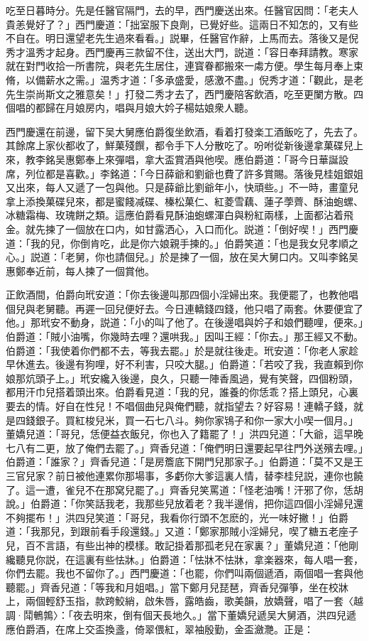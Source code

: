吃至日暮時分。先是任醫官隔門，去的早，西門慶送出來。任醫官因問：「老夫人貴恙覺好了？」西門慶道：「拙室服下良劑，已覺好些。這兩日不知怎的，又有些不自在。明日還望老先生過來看看。」説畢，任醫官作辭，上馬而去。落後又是倪秀才溫秀才起身。西門慶再三款留不住，送出大門，説道：「容日奉拜請教。寒家就在對門收拾一所書院，與老先生居住，連寳眷都搬來一䖏方便。學生每月奉上束脩，以備薪水之需。」温秀才道：「多承盛愛，感激不盡。」倪秀才道：「觀此，是老先生崇尚斯文之雅意矣！」打發二秀才去了，西門慶陪客飲酒，吃至更闌方散。四個唱的都歸在月娘房内，唱與月娘大妗子楊姑娘衆人聽。

西門慶還在前邊，留下吴大舅應伯爵復坐飲酒，看着打發楽工酒飯吃了，先去了。其餘席上家伙都收了，鮮菓殘饌，都令手下人分散吃了。吩咐從新後邊拿菓碟兒上來，教李銘吴惠鄭奉上來彈唱，拿大盃賞酒與他喫。應伯爵道：「哥今日華誕設席，列位都是喜歡。」李銘道：「今日薛爺和劉爺也費了許多賞賜。落後見桂姐銀姐又出來，每人又遞了一包與他。只是薛爺比劉爺年小，快頑些。」不一時，畫童兒拿上添換菓碟兒來，都是蜜餞减碟、榛松菓仁、紅菱雪藕、蓮子荸薺、酥油蚫螺、冰糖霜梅、玫瑰餅之類。這應伯爵看見酥油蚫螺渾白與粉紅兩樣，上面都沾着飛金。就先揀了一個放在口内，如甘露洒心，入口而化。説道：「倒好喫！」西門慶道：「我的兒，你倒肯吃，此是你六娘親手揀的。」伯爵笑道：「也是我女兒孝順之心。」説道：「老舅，你也請個兒。」於是揀了一個，放在吴大舅口内。又叫李銘吴惠鄭奉近前，每人揀了一個賞他。

正飲酒間，伯爵向玳安道：「你去後邊叫那四個小淫婦出來。我便罷了，也教他唱個兒與老舅聽。再遲一回兒便好去。今日連轎錢四錢，他只唱了兩套。休要便宜了他。」那玳安不動身，説道：「小的叫了他了。在後邊唱與妗子和娘們聽哩，便來。」伯爵道：「賊小油嘴，你幾時去哩？還哄我。」因叫王經：「你去。」那王經又不動。伯爵道：「我使着你們都不去，等我去罷。」於是就往後走。玳安道：「你老人家趁早休進去。後邊有狗哩，好不利害，只咬大腿。」伯爵道：「若咬了我，我直賴到你娘那炕頭子上。」玳安纔入後邊，良久，只聽一陣香風過，覺有笑聲，四個粉頭，都用汗巾兒搭着頭出來。伯爵看見道：「我的兒，誰養的你恁乖？搭上頭兒，心裏要去的情。好自在性兒！不唱個曲兒與俺們聽，就指望去？好容易！連轎子錢，就是四錢銀子。買紅梭兒米，買一石七八斗。夠你家鴇子和你一家大小喫一個月。」董嬌兒道：「哥兒，恁便益衣飯兒，你也入了籍罷了！」洪四兒道：「大爺，這早晚七八有二更，放了俺們去罷了。」齊香兒道：「俺們明日還要起早往門外送殯去哩。」伯爵道：「誰家？」齊香兒道：「是房簷底下開門兒那家子。」伯爵道：「莫不又是王三官兒家？前日被他連累你那場事，多虧你大爹這裏人情，替李桂兒説，連你也饒了。這一遭，雀兒不在那窝兒罷了。」齊香兒笑罵道：「怪老油嘴！汗邪了你，恁胡說。」伯爵道：「你笑話我老，我那些兒放着老？我半邊俏，把你這四個小淫婦兒還不夠擺布！」洪四兒笑道：「哥兒，我看你行頭不怎麽的，光一味好撇！」伯爵道：「我那兒，到跟前看手段還錢。」又道：「鄭家那賊小淫婦兒，喫了糖五老座子兒，百不言語，有些出神的模樣。敢記掛着那孤老兒在家裏？」董嬌兒道：「他剛纔聽見你説，在這裏有些怯牀。」伯爵道：「怯牀不怯牀，拿楽器來，每人唱一套，你們去罷。我也不留你了。」西門慶道：「也罷，你們叫兩個遞酒，兩個唱一套與他聽罷。」齊香兒道：「等我和月姐唱。」當下鄭月兒琵琶，齊香兒彈箏，坐在校牀上，兩個輕舒玉指，款跨鮫綃，啟朱唇，露皓齒，歌美韻，放嬌聲，唱了一套〈越調·鬦鵪鶉〉：「夜去明來，倒有個天長地久。」當下董嬌兒遞吴大舅酒，洪四兒遞應伯爵酒，在席上交盃換盞，倚翠偎紅，翠袖殷勤，金盃瀲灧。正是：

